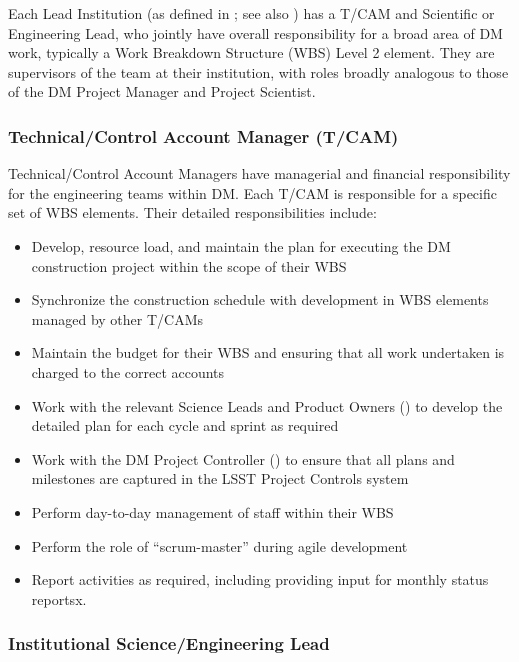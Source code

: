 Each Lead Institution (as defined in ; see also ) has a T/CAM and Scientific or Engineering Lead, who jointly have overall responsibility for a broad area of DM work, typically a Work Breakdown Structure (WBS) Level 2 element. They are supervisors of the team at their institution, with roles broadly analogous to those of the DM Project Manager and Project Scientist.

\subsubsection{Technical/Control Account Manager (T/CAM) \label{role:tcam}}

Technical/Control Account Managers have managerial and financial responsibility
for the engineering teams within DM. Each T/CAM is responsible for a specific set of WBS elements. Their detailed responsibilities include:

\begin{itemize}

  \item{Develop, resource load, and maintain the plan for executing the DM construction project within the scope of their WBS}
  \item{Synchronize the construction schedule with development in WBS elements managed by other T/CAMs}
  \item{Maintain the budget for their WBS and ensuring that all work undertaken is charged to the correct accounts}
  \item{Work with the relevant Science Leads and Product Owners () to develop the detailed plan for each cycle and sprint as required}
  \item{Work with the DM Project Controller () to ensure that all plans and milestones are captured in the LSST Project Controls system}
  \item{Perform day-to-day management of staff within their WBS}
  \item{Perform the role of ``scrum-master'' during agile development}
  \item{Report activities as required, including providing input for monthly status reportsx.}

\end{itemize}

\subsubsection{Institutional Science/Engineering Lead \label{role:scilead}}

